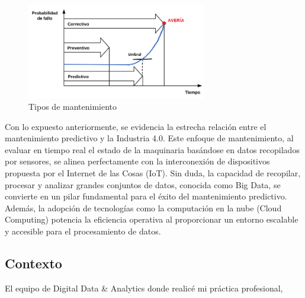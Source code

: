 \documentclass{article}
\begin{document}
\begin{center}
\begin{figure}[h]
  \centering
  \includegraphics[width=0.7\textwidth]{images/mantenimiento.png}
  \caption{Tipos de mantenimiento}
\end{figure}    
\end{center}

Con lo expuesto anteriormente, se evidencia la estrecha relación entre el mantenimiento predictivo y la Industria 4.0. Este enfoque de mantenimiento, al evaluar en tiempo real el estado de la maquinaria basándose en datos recopilados por sensores, se alinea perfectamente con la interconexión de dispositivos propuesta por el Internet de las Cosas (IoT). Sin duda, la capacidad de recopilar, procesar y analizar grandes conjuntos de datos, conocida como Big Data, se convierte en un pilar fundamental para el éxito del mantenimiento predictivo. Además, la adopción de tecnologías como la computación en la nube (Cloud Computing) potencia la eficiencia operativa al proporcionar un entorno escalable y accesible para el procesamiento de datos.

\subsection{Contexto}

El equipo de Digital Data \& Analytics donde realicé mi práctica profesional,
\end{document}
